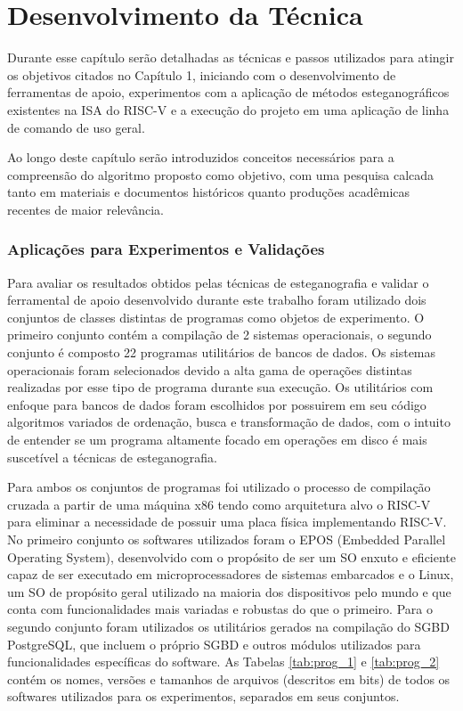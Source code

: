 \chapter{Desenvolvimento da Técnica}\label{cap:desenvolvimento}

Durante esse capítulo serão detalhadas as técnicas e passos utilizados para atingir os objetivos citados no Capítulo 1, iniciando com o desenvolvimento de ferramentas de apoio, experimentos com a aplicação de métodos esteganográficos existentes na ISA do RISC-V e a execução do projeto em uma aplicação de linha de comando de uso geral.

Ao longo deste capítulo serão introduzidos conceitos necessários para a compreensão do algoritmo proposto como objetivo, com uma pesquisa calcada tanto em materiais e documentos históricos quanto produções acadêmicas recentes de maior relevância.

\subsection{Aplicações para Experimentos e Validações}

Para avaliar os resultados obtidos pelas técnicas de esteganografia e validar o ferramental de apoio desenvolvido durante este trabalho foram utilizado dois conjuntos de classes distintas de programas como objetos de experimento. O primeiro conjunto contém a compilação de 2 sistemas operacionais, o segundo conjunto é composto 22 programas utilitários de bancos de dados. Os sistemas operacionais foram selecionados devido a alta gama de operações distintas realizadas por esse tipo de programa durante sua execução. Os utilitários com enfoque para bancos de dados foram escolhidos por possuirem em seu código algoritmos variados de ordenação, busca e transformação de dados, com o intuito de entender se um programa altamente focado em operações em disco é mais suscetível a técnicas de esteganografia. 

Para ambos os conjuntos de programas foi utilizado o processo de compilação cruzada a partir de uma máquina x86 tendo como arquitetura alvo o RISC-V para eliminar a necessidade de possuir uma placa física implementando RISC-V. No primeiro conjunto os softwares utilizados foram o EPOS (Embedded Parallel Operating System), desenvolvido com o propósito de ser um SO enxuto e eficiente capaz de ser executado em microprocessadores de sistemas embarcados e o Linux, um SO de propósito geral utilizado na maioria dos dispositivos pelo mundo e que conta com funcionalidades mais variadas e robustas do que o primeiro. Para o segundo conjunto foram utilizados os utilitários gerados na compilação do SGBD PostgreSQL, que incluem o próprio SGBD e outros módulos utilizados para funcionalidades específicas do software. As Tabelas \ref{tab:prog_1} e \ref{tab:prog_2} contém os nomes, versões e tamanhos de arquivos (descritos em bits) de todos os softwares utilizados para os experimentos, separados em seus conjuntos. 

